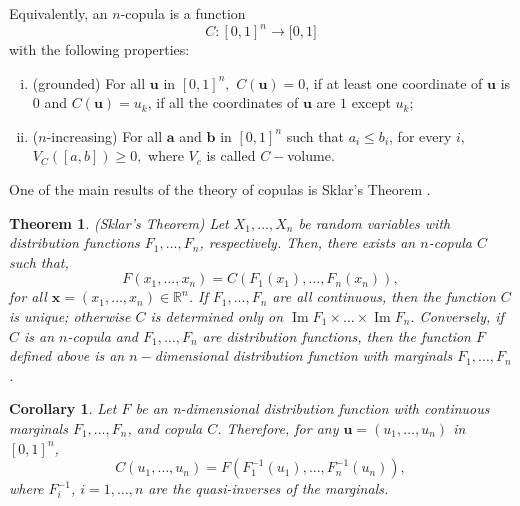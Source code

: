 \documentclass[a4paper,10pt]{article}
\DeclareMathOperator{\Ima}{Im}
\newtheorem{theorem}{Theorem}
\newtheorem{corollary}{Corollary}[theorem]
\begin{document}
Equivalently, an $n$-copula is a function
\begin{equation*}
C:[0,1]^{n}\rightarrow \lbrack 0,1]
\end{equation*}%
with the following properties:
\begin{enumerate}[(i)]
	\item (grounded) For all $\mathbf{u}$ in $[0,1]^{n},$ $C(\mathbf{u})=0$, if at least one coordinate of $\mathbf{u}$ is $0$ and $C(\mathbf{u})=u_{k}$, if all the coordinates of $\mathbf{u}$ are $1$ except $u_{k};$ 
	\item ($n$-increasing) For all $\mathbf{a}$ and $\mathbf{b}$ in $[0,1]^{n}$ such that $a_{i}\leq b_{i}$, for every $i,$ $V_{C}\left( \left[ a,b\right] \right) \geq 0,$ where $V_{c}$ is called $C-$volume.
\end{enumerate}

One of the main results of the theory of copulas is Sklar's Theorem \citet*{sklar1959}.

\bigskip

\begin{theorem}
(Sklar's Theorem) Let $X_{1},\ldots,X_{n}$ be random variables with distribution functions $F_{1},...,F_{n}$, respectively. Then, there exists an $n$-copula $C$ such that,
\begin{equation}
F\left( x_{1},\ldots,x_{n}\right) =C\left( F_{1}\left( x_{1}\right),\ldots,F_{n}\left(x_{n}\right) \right),  \label{21} 
\end{equation}
\noindent for all $\mathbf{x}=\left( x_{1},\ldots,x_{n}\right) \in\mathbb{R}^{n}$. If $F_{1},...,F_{n}$ are all continuous, then the function $C$ is unique; otherwise $C$ is determined only on $\Ima F_{1}\times \ldots\times \Ima F_{n}$. Conversely, if $C$ is an $n$-copula and $F_{1},\ldots,F_{n}$ are distribution functions, then the function $F$ defined above is an $n-$dimensional distribution function with marginals $F_{1},\ldots,F_{n}$.
\end{theorem} 

\bigskip

\begin{corollary}
Let $F$ be an n-dimensional distribution function with continuous marginals $F_{1},\ldots,F_{n}$, and copula $C$. Therefore, for any $\mathbf{u}=\left(u_{1},\ldots,u_{n}\right) $ in $\left[ 0,1\right]^{n}$,
\begin{equation}
C\left( u_{1},\ldots,u_{n}\right) =F\left( F_{1}^{-1}\left( u_{1}\right)
,...,F_{n}^{-1}\left( u_{n}\right) \right) ,  \label{22}
\end{equation}
where $F_{i}^{-1}$, $i=1,\ldots,n$ are the quasi-inverses of the marginals.
\end{corollary}
\end{document}
